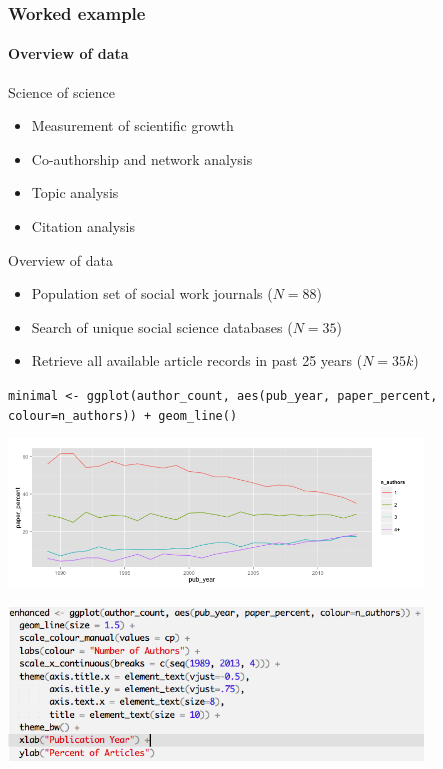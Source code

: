 \documentclass{beamer}
\begin{document}
\begin{frame}\frametitle{Worked example}
\framesubtitle{Overview of data}

	\begin{alertblock}{Science of science}
		\begin{itemize}
			\item Measurement of scientific growth 
			\item Co-authorship and network analysis
			\item Topic analysis
			\item Citation analysis
		\end{itemize}
	\end{alertblock}

	\begin{exampleblock}{Overview of data}
		\begin{itemize}
			\item Population set of social work journals ($N = 88$)
			\item Search of unique social science databases ($N = 35$)
			\item Retrieve all available article records in past 25 years ($N = 35k$)
		\end{itemize}
	\end{exampleblock}
\end{frame}




\begin{frame}
\footnotesize \texttt{minimal <- ggplot(author\_count, aes(pub\_year, paper\_percent, colour=n\_authors)) + 
  geom\_line()} 

\includegraphics[width=110mm,scale=0.5]{minimal.png}
\end{frame}



\begin{frame}
\includegraphics[width=110mm,scale=0.5]{enhancedcode.png}
\end{frame}
\end{document}
